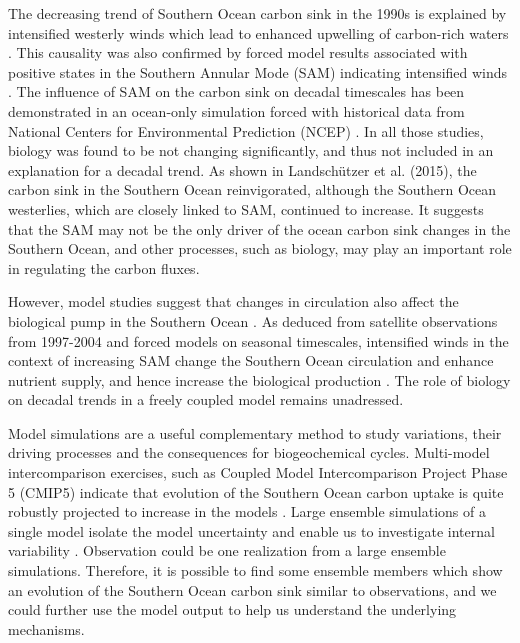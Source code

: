 \documentclass[12pt]{article}
\begin{document}
The decreasing trend of Southern Ocean carbon sink in the 1990s is explained by intensified westerly winds which lead to enhanced upwelling of carbon-rich waters \citep{LeQuere2007}. This causality was also confirmed by forced model results associated with positive states in the Southern Annular Mode (SAM) indicating intensified winds \citep{Lovenduski2007}. The influence of SAM on the carbon sink on decadal timescales has been demonstrated in an ocean-only simulation forced with historical data from National Centers for Environmental Prediction (NCEP) \citep{Lovenduski2008}. In all those studies, biology was found to be not changing significantly, and thus not included in an explanation for a decadal trend. As shown in Landsch{\"u}tzer et al. (2015), the carbon sink in the Southern Ocean reinvigorated, although the Southern Ocean westerlies, which are closely linked to SAM, continued to increase. It suggests that the SAM may not be the only driver of the ocean carbon sink changes in the Southern Ocean, and other processes, such as biology, may play an important role in regulating the carbon fluxes.   


However, model studies suggest that changes in circulation also affect the biological pump in the Southern Ocean \citep{Sarmiento1998}. As deduced from satellite observations from 1997-2004 and forced models on seasonal timescales, intensified winds in the context of increasing SAM change the Southern Ocean circulation and enhance nutrient supply, and hence increase the biological production \citep{Lovenduski2005,Hauck2013}. The role of biology on decadal trends in a freely coupled model remains unadressed.

Model simulations are a useful complementary method to study variations, their driving processes and the consequences for biogeochemical cycles. Multi-model intercomparison exercises, such as Coupled Model Intercomparison Project Phase 5 (CMIP5) indicate that evolution of the Southern Ocean carbon uptake is quite robustly projected to increase in the models \citep{Wang2016}. 
Large ensemble simulations of a single model isolate the model uncertainty and enable us to investigate internal variability \citep{McKinley2016}. Observation could be one realization from a large ensemble simulations. Therefore, it is possible to find some ensemble members which show an evolution of the Southern Ocean carbon sink similar to observations, and we could further use the model output to help us understand the underlying mechanisms.
\end{document}
